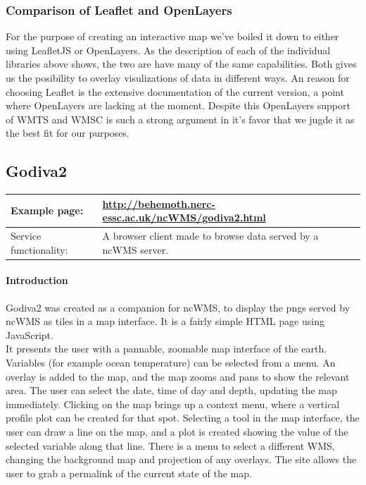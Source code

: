 \documentclass[11pt,a4paper,titlepage,oneside]{report}
\begin{document}
  \subsubsection{Comparison of Leaflet and OpenLayers}
    For the purpose of creating an interactive map we've boiled it down to either using LeafletJS or OpenLayers. As the description of each of the individual libraries above shows, the two are have many of the same capabilities. Both gives us the posibility to overlay visulizations of data in different ways. An reason for choosing Leaflet is the extensive documentation of the current version, a point where OpenLayers are lacking at the moment. Despite this OpenLayers support of WMTS and WMSC is such a strong argument in it's favor that we jugde it as the best fit for our purposes.
    
  \subsection{Godiva2}
     \begin{tabular}{|p{4cm}|p{8cm}|}
     \hline
     Example page: & \url{http://behemoth.nerc-essc.ac.uk/ncWMS/godiva2.html} \\
     \hline
     Service functionality: & A browser client made to browse data served by a ncWMS server. \\
     \hline
   \end{tabular}
   
  \paragraph{Introduction}
  Godiva2 was created as a companion for ncWMS, to display the pngs served by ncWMS as tiles in a map interface. It is a fairly simple \gls{HTML} page using JavaScript. \\
   It presents the user with a pannable, zoomable map interface of the earth. Variables (for example ocean temperature) can be selected from a menu. An overlay is added to the map, and the map zooms and pans to show the relevant area. The user can select the date, time of day and depth, updating the map immediately. Clicking on the map brings up a context menu, where a vertical profile plot can be created for that spot. Selecting a tool in the map interface, the user can draw a line on the map, and a plot is created showing the value of the selected variable along that line. There is a menu to select a different \gls{WMS}, changing the background map and projection of any overlays. The site allows the user to grab a permalink of the current state of the map.
\end{document}
